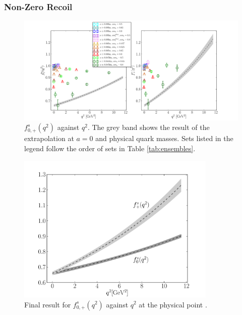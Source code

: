 \begin{figure}[ht]
\begin{center}
{    \label{fig:directtests}}
  \end{center}
\end{figure}

\subsubsection{Non-Zero Recoil}

\begin{figure}[htb!]
  \hspace{-85pt}
  \includegraphics[width=1.40\textwidth]{images/BsDs/direct/f0fp_vsq2.pdf}
  \caption{ $f_{0,+}^s(q^2)$ against $q^2$. The grey band shows the result of the extrapolation at $a=0$ and physical quark masses. Sets listed in the legend follow the order of sets in Table \ref{tab:ensembles}. \label{fig:directdata}}
\end{figure}

\begin{figure}[htb!]
  \begin{center}
  \includegraphics[width=0.85\textwidth]{images/BsDs/direct/f0fp_final.pdf}
  \caption{ Final result for $f_{0,+}^s(q^2)$ against $q^2$ at the physical point \label{fig:directfinal}.}
    \end{center}
\end{figure}

